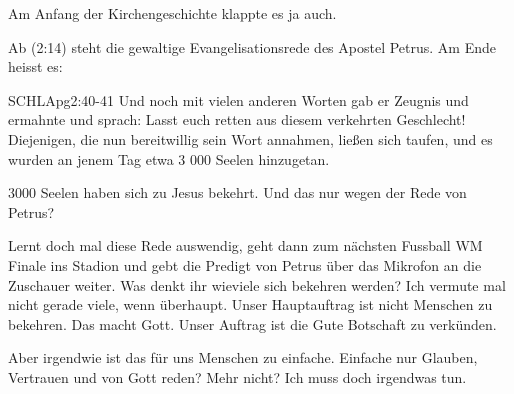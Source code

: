 \documentclass[12pt]{../../inc/mybib}
\newenvironment{block}[1][]{%
  \vspace{1.5em}%
  \noindent\textbf{#1}\par%
  \vspace{0.0em}%
}{%
  \vspace{1em}%
}
\begin{document}
    Am Anfang der Kirchengeschichte klappte es ja auch.
\begin{block}
    Ab (2:14) steht die gewaltige Evangelisationsrede des Apostel Petrus. Am Ende heisst es:
    \begin{bibelbox}{SCHL}{Apg}{2:40-41}
        Und noch mit vielen anderen Worten gab er Zeugnis und ermahnte und sprach: Lasst euch retten aus diesem verkehrten Geschlecht! Diejenigen, die nun bereitwillig sein Wort annahmen, ließen sich taufen, und es wurden an jenem Tag etwa 3 000 Seelen hinzugetan.
    \end{bibelbox} 
    3000 Seelen haben sich zu Jesus bekehrt. Und das nur wegen der Rede von Petrus?
    
    Lernt doch mal diese Rede auswendig, geht dann zum nächsten Fussball WM Finale ins Stadion und gebt die Predigt von Petrus über das Mikrofon an die Zuschauer weiter. Was denkt ihr wieviele sich bekehren werden? Ich vermute mal nicht gerade viele, wenn überhaupt. Unser Hauptauftrag ist nicht Menschen zu bekehren. Das macht Gott. Unser Auftrag ist die Gute Botschaft zu verkünden.
\end{block}
\begin{block}
    Aber irgendwie ist das für uns Menschen zu einfache. Einfache nur Glauben, Vertrauen und von Gott reden? Mehr nicht? Ich muss doch irgendwas tun.
\end{block}
\end{document}

